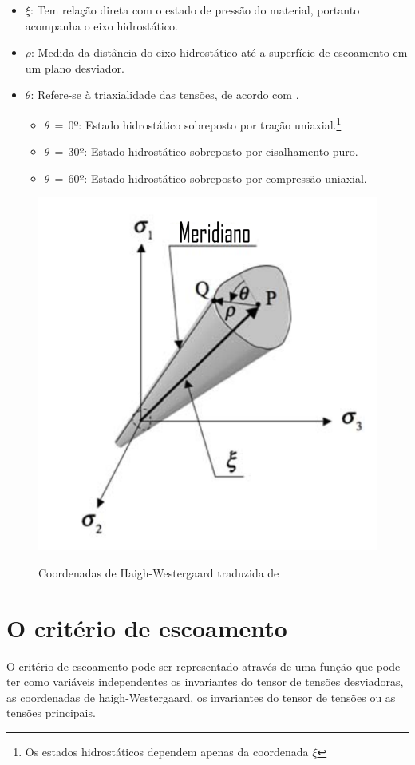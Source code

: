 \begin{itemize}
    \item $ \xi $: Tem relação direta com o estado de pressão do material, portanto acompanha o eixo hidrostático.
    \item $ \rho $: Medida da distância do eixo hidrostático até a superfície de escoamento em um plano desviador.
    \item $ \theta $: Refere-se à triaxialidade das tensões, de acordo com \cite{hiermaier_2008}.
    \begin{itemize}
        \item $\theta \, = \, 0 º$: Estado hidrostático sobreposto por tração uniaxial.\footnote{Os estados hidrostáticos dependem apenas da coordenada $\xi$}
        \item $\theta \, = \, 30 º$: Estado hidrostático sobreposto por cisalhamento puro.
        \item $\theta \, = \, 60 º$: Estado hidrostático sobreposto por compressão uniaxial. 
    \end{itemize}
\end{itemize}


\begin{figure}[H]
    \centering
    \caption{Coordenadas de Haigh-Westergaard traduzida de \cite{hiermaier_2008}}
    \includegraphics[width=0.5\linewidth]{images/Haigh_Wester.png}
    \label{fig:coordhaigh}
\end{figure}

\section{O critério de escoamento}

O critério de escoamento pode ser representado através de uma função que pode ter como variáveis independentes os invariantes do tensor de tensões desviadoras, as coordenadas de haigh-Westergaard, os invariantes do tensor de tensões ou as tensões principais. \\

